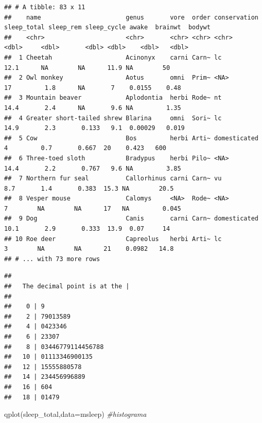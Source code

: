 \documentclass[
]{article}
\newenvironment{Shaded}{\begin{snugshade}}{\end{snugshade}}
\newcommand{\AttributeTok}[1]{\textcolor[rgb]{0.77,0.63,0.00}{#1}}
\newcommand{\CommentTok}[1]{\textcolor[rgb]{0.56,0.35,0.01}{\textit{#1}}}
\newcommand{\FunctionTok}[1]{\textcolor[rgb]{0.00,0.00,0.00}{#1}}
\newcommand{\NormalTok}[1]{#1}
\newcommand{\SpecialCharTok}[1]{\textcolor[rgb]{0.00,0.00,0.00}{#1}}
\numberwithin{ejcnt}{section}
\begin{document}
\begin{verbatim}
## # A tibble: 83 x 11
##    name                       genus       vore  order conservation sleep_total sleep_rem sleep_cycle awake  brainwt  bodywt
##    <chr>                      <chr>       <chr> <chr> <chr>              <dbl>     <dbl>       <dbl> <dbl>    <dbl>   <dbl>
##  1 Cheetah                    Acinonyx    carni Carn~ lc                  12.1      NA        NA      11.9 NA        50    
##  2 Owl monkey                 Aotus       omni  Prim~ <NA>                17         1.8      NA       7    0.0155    0.48 
##  3 Mountain beaver            Aplodontia  herbi Rode~ nt                  14.4       2.4      NA       9.6 NA         1.35 
##  4 Greater short-tailed shrew Blarina     omni  Sori~ lc                  14.9       2.3       0.133   9.1  0.00029   0.019
##  5 Cow                        Bos         herbi Arti~ domesticated         4         0.7       0.667  20    0.423   600    
##  6 Three-toed sloth           Bradypus    herbi Pilo~ <NA>                14.4       2.2       0.767   9.6 NA         3.85 
##  7 Northern fur seal          Callorhinus carni Carn~ vu                   8.7       1.4       0.383  15.3 NA        20.5  
##  8 Vesper mouse               Calomys     <NA>  Rode~ <NA>                 7        NA        NA      17   NA         0.045
##  9 Dog                        Canis       carni Carn~ domesticated        10.1       2.9       0.333  13.9  0.07     14    
## 10 Roe deer                   Capreolus   herbi Arti~ lc                   3        NA        NA      21    0.0982   14.8  
## # ... with 73 more rows
\end{verbatim}

\begin{Shaded}
\end{Shaded}

\begin{verbatim}
## 
##   The decimal point is at the |
## 
##    0 | 9
##    2 | 79013589
##    4 | 0423346
##    6 | 23307
##    8 | 03446779114456788
##   10 | 01113346900135
##   12 | 15555880578
##   14 | 234456996889
##   16 | 604
##   18 | 01479
\end{verbatim}

\begin{Shaded}
\begin{Highlighting}[]
\FunctionTok{qplot}\NormalTok{(sleep\_total,}\AttributeTok{data=}\NormalTok{msleep) }\CommentTok{\#histograma }
\end{Highlighting}
\end{Shaded}
\end{document}
